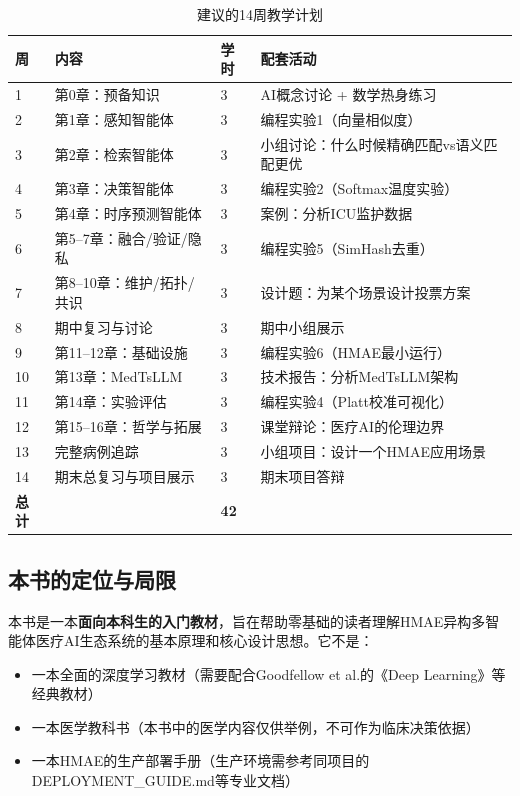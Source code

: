 \documentclass[11pt,a4paper]{ctexart}
\begin{document}
\begin{table}[H]
\centering
\small
\begin{tabular}{p{1cm}p{5cm}p{2cm}p{5cm}}
\toprule
\textbf{周} & \textbf{内容} & \textbf{学时} & \textbf{配套活动} \\
\midrule
1 & 第0章：预备知识 & 3 & AI概念讨论 + 数学热身练习 \\
2 & 第1章：感知智能体 & 3 & 编程实验1（向量相似度）\\
3 & 第2章：检索智能体 & 3 & 小组讨论：什么时候精确匹配vs语义匹配更优 \\
4 & 第3章：决策智能体 & 3 & 编程实验2（Softmax温度实验）\\
5 & 第4章：时序预测智能体 & 3 & 案例：分析ICU监护数据 \\
6 & 第5--7章：融合/验证/隐私 & 3 & 编程实验5（SimHash去重）\\
7 & 第8--10章：维护/拓扑/共识 & 3 & 设计题：为某个场景设计投票方案 \\
8 & 期中复习与讨论 & 3 & 期中小组展示 \\
9 & 第11--12章：基础设施 & 3 & 编程实验6（HMAE最小运行）\\
10 & 第13章：MedTsLLM & 3 & 技术报告：分析MedTsLLM架构 \\
11 & 第14章：实验评估 & 3 & 编程实验4（Platt校准可视化）\\
12 & 第15--16章：哲学与拓展 & 3 & 课堂辩论：医疗AI的伦理边界 \\
13 & 完整病例追踪 & 3 & 小组项目：设计一个HMAE应用场景 \\
14 & 期末总复习与项目展示 & 3 & 期末项目答辩 \\
\midrule
\textbf{总计} & & \textbf{42} & \\
\bottomrule
\end{tabular}
\caption{建议的14周教学计划}
\end{table}

\subsection*{本书的定位与局限}

本书是一本\textbf{面向本科生的入门教材}，旨在帮助零基础的读者理解HMAE异构多智能体医疗AI生态系统的基本原理和核心设计思想。它不是：

\begin{itemize}[nosep]
\item 一本全面的深度学习教材（需要配合Goodfellow et al.的《Deep Learning》等经典教材）
\item 一本医学教科书（本书中的医学内容仅供举例，不可作为临床决策依据）
\item 一本HMAE的生产部署手册（生产环境需参考同项目的DEPLOYMENT\_GUIDE.md等专业文档）
\end{itemize}
\end{document}
